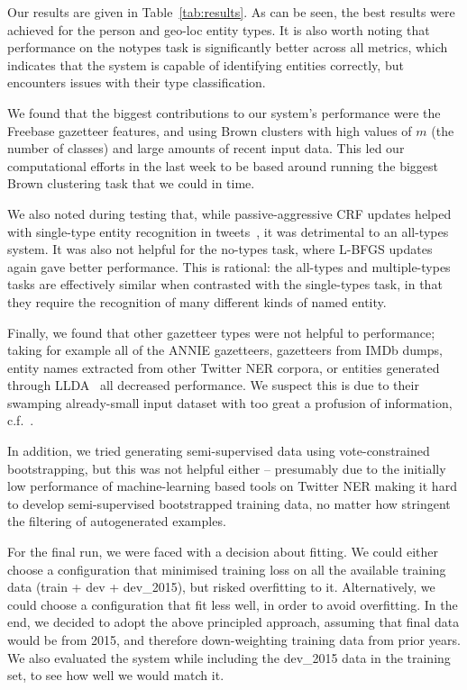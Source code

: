\documentclass[11pt|a4paper]{article}
\begin{document}
Our results are given in Table~\ref{tab:results}. As can be seen, the best results were achieved for the person and geo-loc entity types. It is also worth noting that performance on the notypes task is significantly better across all metrics, which indicates that the system is capable of identifying entities correctly, but encounters issues with their type classification. 

We found that the biggest contributions to our system's performance were the Freebase gazetteer features, and using Brown clusters with high values of $m$ (the number of classes) and large amounts of recent input data.
This led our computational efforts in the last week to be based around running the biggest Brown clustering task that we could in time.

We also noted during testing that, while passive-aggressive CRF updates helped with single-type entity recognition in tweets~\cite{derczynski2014passive}, it was detrimental to an all-types system.
It was also not helpful for the no-types task, where L-BFGS updates again gave better performance.
This is rational: the all-types and multiple-types tasks are effectively similar when contrasted with the single-types task, in that they require the recognition of many different kinds of named entity.

Finally, we found that other gazetteer types were not helpful to performance; taking for example all of the ANNIE gazetteers, gazetteers from IMDb dumps, entity names extracted from other Twitter NER corpora, or entities generated through LLDA~\cite{Ritter2011} all decreased performance.
We suspect this is due to their swamping already-small input dataset with too great a profusion of information, c.f.~.

In addition, we tried generating semi-supervised data using vote-constrained bootstrapping, but this was not helpful either -- presumably due to the initially low performance of machine-learning based tools on Twitter NER making it hard to develop semi-supervised bootstrapped training data, no matter how stringent the filtering of autogenerated examples.

For the final run, we were faced with a decision about fitting.
We could either choose a configuration that minimised training loss on all the available training data (train + dev + dev\_2015), but risked overfitting to it.
Alternatively, we could choose a configuration that fit less well, in order to avoid overfitting.
In the end, we decided to adopt the above principled approach, assuming that final data would be from 2015, and therefore down-weighting training data from prior years.
We also evaluated the system while including the dev\_2015 data in the training set, to see how well we would match it.
\end{document}
